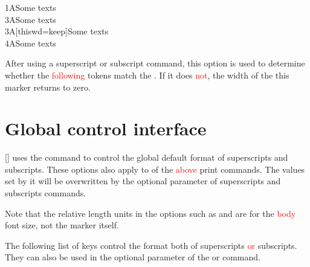 \documentclass[load-preamble+]{cnltx-doc}
\renewcommand{\emph}[1]{\textcolor{red}{#1}}
\begin{document}
\begin{options}
\begin{demohigh}
1ASome texts \\
3ASome texts \\
3A[thiswd=keep]Some texts \\
4ASome texts
\end{demohigh}
  After using a superscript or subscript command, this option is used to determine whether the \textcolor{red}{following} tokens match the . If it does \textcolor{red}{not}, the width of the this marker returns to zero.
\begin{codehigh}
\newcommand{\mysp}[2][]{\super[regex=\c{mysb},#1]{#2}}
\newcommand{\mysb}[2][]{\sub[regex=\c{mysp},#1]{#2}}
\end{codehigh}
\end{options}

\section{Global control interface}
\label{sec:global control interface}
\begin{commands}
  []
   uses the  command to control the global default format of superscripts and subscripts. These options also apply to  of the \textcolor{red}{above} print commands. The values set by it will be overwritten by the optional parameter of superscripts and subscripts commands.

  Note that the relative length units in the options such as  and  are for the \textcolor{red}{body} font size, not the marker itself.

  The following list of keys control the format both of superscripts \emph{or} subscripts. They can also be used in the optional parameter of the  or  command.
\end{commands}
\end{document}
